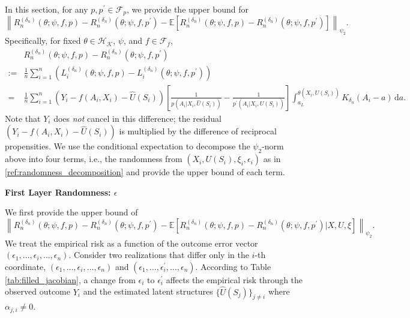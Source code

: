 \documentclass[12pt]{article}
\newcommand{\E}{\mathbb{E}}
\begin{document}
In this section, for any $p,p^\prime\in\mathcal{F}_{p}$, we provide the upper bound for
$$\left\|R_n^{(\delta_n)}(\theta;\psi,f,p)-R_n^{({\delta_n})}(\theta;\psi,f,p^\prime)-\E\left[R_n^{(\delta_n)}(\theta;\psi,f,p)-R_n^{({\delta_n})}(\theta;\psi,f,p^\prime)\right]\right\|_{\psi_2}.$$
Specifically, for fixed $\theta\in\mathcal{H}_\mathcal{K}$, $\psi$, and $f\in\mathcal{F}_f$,
\begin{align*}
    &R_n^{(\delta_n)}(\theta;\psi,f,p)-R_n^{({\delta_n})}(\theta;\psi,f,p^\prime)\\
    := & \frac{1}{n}\sum_{i=1}^n \left(L^{(\delta_n)}_i(\theta;\psi,f,p) - L^{(\delta_n)}_i(\theta;\psi,f,p^\prime)\right)
    \\
    = & \frac{1}{n}\sum_{i=1}^n \left(Y_i-f(A_i,X_i)-\widehat{U}(S_i)\right)\left[\frac{1}{p(A_i|X_i,\widehat{U}(S_i))}-\frac{1}{p^\prime(A_i|X_i,\widehat{U}(S_i))}\right]\int_{a_L}^{\theta(X_i,\widehat{U}(S_i))}K_{\delta_n}(A_i-a)\,\mathrm{d}a.
\end{align*}
Note that $Y_i$ does \emph{not} cancel in this difference; the residual $(Y_i-f(A_i,X_i)-\widehat{U}(S_i))$ is multiplied by the difference of reciprocal propensities.
We use the conditional expectation to decompose the $\psi_2$-norm above into four terms, i.e., the randomness from $(X_i,U(S_i),\xi_i,\epsilon_i)$ as in \eqref{ref:randomness_decomposition} and provide the upper bound of each term.

\noindent\textbf{First Layer Randomness: $\epsilon$}

\noindent We first provide the upper bound of
$$\left\|R_n^{(\delta_n)}(\theta;\psi,f,p)-R_n^{({\delta_n})}(\theta;\psi,f,p^\prime)-\E\left[R_n^{(\delta_n)}(\theta;\psi,f,p)-R_n^{({\delta_n})}(\theta;\psi,f,p^\prime)|X,U,\xi\right]\right\|_{\psi_2}.$$
We treat the empirical risk as a function of the outcome error vector $(\epsilon_1, \ldots,\epsilon_i,\ldots, \epsilon_n)$. Consider two realizations that differ only in the $i$-th coordinate, $(\epsilon_1, \ldots,\epsilon_i,\ldots, \epsilon_n)$ and $(\epsilon_1, \ldots,\epsilon_i^\prime,\ldots, \epsilon_n)$. According to Table \ref{tab:filled_jacobian}, a change from $\epsilon_i$ to $\epsilon_i^\prime$ affects the empirical risk through the observed outcome $Y_i$ and the estimated latent structures $\{\widehat U(S_j)\}_{j\neq i}$ where $\alpha_{j,i}\neq 0$.
\end{document}
